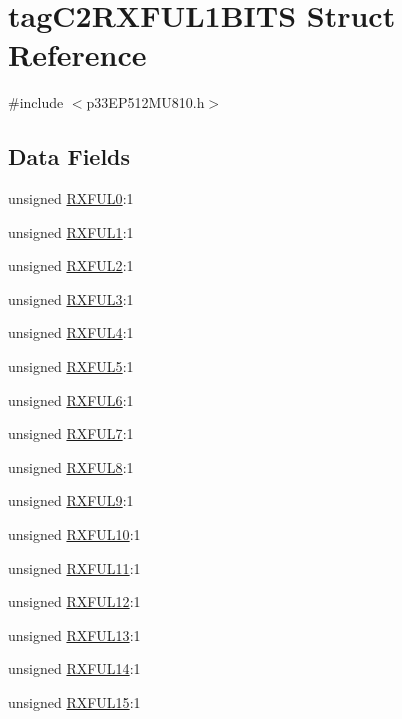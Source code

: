 \hypertarget{structtag_c2_r_x_f_u_l1_b_i_t_s}{}\section{tag\+C2\+R\+X\+F\+U\+L1\+B\+I\+TS Struct Reference}
\label{structtag_c2_r_x_f_u_l1_b_i_t_s}


{\ttfamily \#include $<$p33\+E\+P512\+M\+U810.\+h$>$}

\subsection*{Data Fields}
\begin{DoxyCompactItemize}
\item 
unsigned \hyperlink{structtag_c2_r_x_f_u_l1_b_i_t_s_ae756b430660e9e481fba2ca438b547dc}{R\+X\+F\+U\+L0}\+:1
\item 
unsigned \hyperlink{structtag_c2_r_x_f_u_l1_b_i_t_s_af87a275bb397711a3bc83c1fc6103054}{R\+X\+F\+U\+L1}\+:1
\item 
unsigned \hyperlink{structtag_c2_r_x_f_u_l1_b_i_t_s_a4f5302ac168a05086314273be46e4c6c}{R\+X\+F\+U\+L2}\+:1
\item 
unsigned \hyperlink{structtag_c2_r_x_f_u_l1_b_i_t_s_a156443e10fec742c255f6d9daefa9b7e}{R\+X\+F\+U\+L3}\+:1
\item 
unsigned \hyperlink{structtag_c2_r_x_f_u_l1_b_i_t_s_a70136dd055d84e91b11b84c3440d24e6}{R\+X\+F\+U\+L4}\+:1
\item 
unsigned \hyperlink{structtag_c2_r_x_f_u_l1_b_i_t_s_ae255451f608aa893cf3fb8d3dba00942}{R\+X\+F\+U\+L5}\+:1
\item 
unsigned \hyperlink{structtag_c2_r_x_f_u_l1_b_i_t_s_a86fba67150007acacde5099de1fb81ed}{R\+X\+F\+U\+L6}\+:1
\item 
unsigned \hyperlink{structtag_c2_r_x_f_u_l1_b_i_t_s_a5312a47e81bdc805b786012f0352d30f}{R\+X\+F\+U\+L7}\+:1
\item 
unsigned \hyperlink{structtag_c2_r_x_f_u_l1_b_i_t_s_ad17d5829356ed65ce1d18665178866ff}{R\+X\+F\+U\+L8}\+:1
\item 
unsigned \hyperlink{structtag_c2_r_x_f_u_l1_b_i_t_s_a103e4f37d0fd339da6f11ef9d24e04a0}{R\+X\+F\+U\+L9}\+:1
\item 
unsigned \hyperlink{structtag_c2_r_x_f_u_l1_b_i_t_s_adc7d2d6733137388616554521e93c5fd}{R\+X\+F\+U\+L10}\+:1
\item 
unsigned \hyperlink{structtag_c2_r_x_f_u_l1_b_i_t_s_a2008464385ee4a5ccf21e9f3cb07d7e5}{R\+X\+F\+U\+L11}\+:1
\item 
unsigned \hyperlink{structtag_c2_r_x_f_u_l1_b_i_t_s_a964b6545eb6b6089457dcf8fe8a5ca06}{R\+X\+F\+U\+L12}\+:1
\item 
unsigned \hyperlink{structtag_c2_r_x_f_u_l1_b_i_t_s_a552563cf134c9b4452979eccaf6ec606}{R\+X\+F\+U\+L13}\+:1
\item 
unsigned \hyperlink{structtag_c2_r_x_f_u_l1_b_i_t_s_a086d6be637f0b3ce869087178f474730}{R\+X\+F\+U\+L14}\+:1
\item 
unsigned \hyperlink{structtag_c2_r_x_f_u_l1_b_i_t_s_a2369c06d5340e50aebf84f6952b9b0b9}{R\+X\+F\+U\+L15}\+:1
\end{DoxyCompactItemize}


